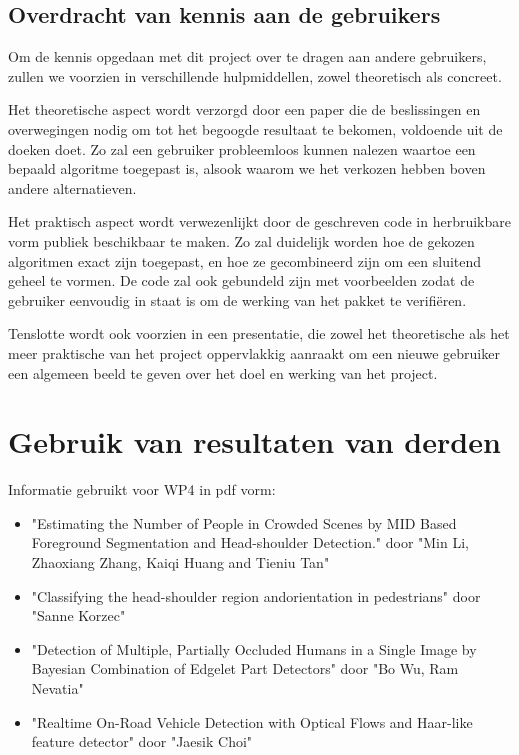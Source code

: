 \documentclass[a4paper,oneside,11pt,final]{memoir}
\begin{document}
\subsection{Overdracht van kennis aan de gebruikers}\label{sec:Overdracht}


Om de kennis opgedaan met dit project over te dragen aan andere gebruikers, zullen we voorzien in verschillende hulpmiddellen, zowel theoretisch als concreet.

Het theoretische aspect wordt verzorgd door een paper die de beslissingen en overwegingen nodig om tot het begoogde resultaat te bekomen, voldoende uit de doeken doet. Zo zal een gebruiker probleemloos kunnen nalezen waartoe een bepaald algoritme toegepast is, alsook waarom we het verkozen hebben boven andere alternatieven.

Het praktisch aspect wordt verwezenlijkt door de geschreven code in herbruikbare vorm publiek beschikbaar te maken. Zo zal duidelijk worden hoe de gekozen algoritmen exact zijn toegepast, en hoe ze gecombineerd zijn om een sluitend geheel te vormen. De code zal ook gebundeld zijn met voorbeelden zodat de gebruiker eenvoudig in staat is om de werking van het pakket te verifiëren.

Tenslotte wordt ook voorzien in een presentatie, die zowel het theoretische als het meer praktische van het project oppervlakkig aanraakt om een nieuwe gebruiker een algemeen beeld te geven over het doel en werking van het project.

\section*{Gebruik van resultaten van derden}\label{sec:Gebruik}

Informatie gebruikt voor WP4 in pdf vorm:
\begin{itemize}
\item "Estimating the Number of People in Crowded Scenes by MID Based Foreground Segmentation and Head-shoulder Detection." door "Min Li, Zhaoxiang Zhang, Kaiqi Huang and Tieniu Tan"
\item "Classifying the head-shoulder region andorientation in pedestrians" door "Sanne Korzec"
\item "Detection of Multiple, Partially Occluded Humans in a Single Image by Bayesian Combination of Edgelet Part Detectors" door "Bo Wu, Ram Nevatia"
\item "Realtime On-Road Vehicle Detection with Optical Flows and Haar-like feature detector" door "Jaesik Choi"
\end{itemize}
\end{document}
